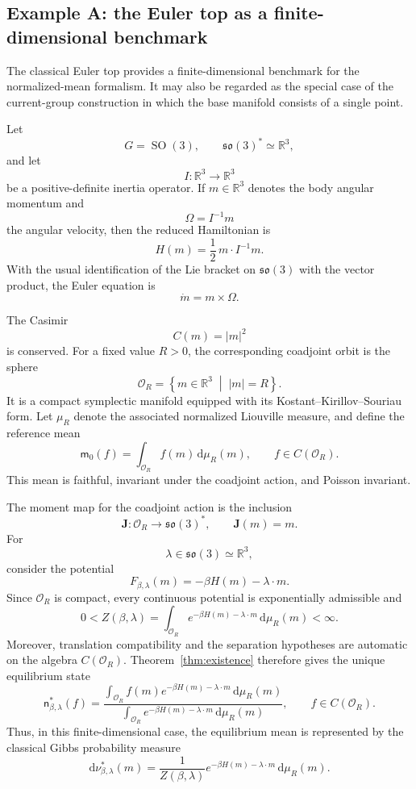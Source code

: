 \documentclass[11pt,reqno]{amsart}
\begin{document}
\subsection{Example A: the Euler top as a finite-dimensional benchmark}
\label{subsec:euler-top-example}

The classical Euler top provides a finite-dimensional benchmark for the
normalized-mean formalism. It may also be regarded as the special case
of the current-group construction in which the base manifold consists
of a single point.

Let
\[
G=\operatorname{SO}(3),
\qquad
\mathfrak{so}(3)^*\simeq\mathbb R^3,
\]
and let
\[
I\colon\mathbb R^3\longrightarrow\mathbb R^3
\]
be a positive-definite inertia operator. If
$m\in\mathbb R^3$ denotes the body angular momentum and
\[
\Omega=I^{-1}m
\]
the angular velocity, then the reduced Hamiltonian is
\[
H(m)
=
\frac12\,m\cdot I^{-1}m.
\]
With the usual identification of the Lie bracket on
$\mathfrak{so}(3)$ with the vector product, the Euler equation is
\[
\dot m=m\times\Omega.
\]

The Casimir
\[
C(m)=|m|^2
\]
is conserved. For a fixed value $R>0$, the corresponding coadjoint
orbit is the sphere
\[
\mathcal O_R
=
\left\{
m\in\mathbb R^3
\;\middle|\;
|m|=R
\right\}.
\]
It is a compact symplectic manifold equipped with its
Kostant--Kirillov--Souriau form. Let $\mu_R$ denote the associated
normalized Liouville measure, and define the reference mean
\[
\mathsf m_0(f)
=
\int_{\mathcal O_R}f(m)\,\mathrm d\mu_R(m),
\qquad
f\in C(\mathcal O_R).
\]
This mean is faithful, invariant under the coadjoint action, and
Poisson invariant.

The moment map for the coadjoint action is the inclusion
\[
\mathbf J\colon\mathcal O_R\longrightarrow\mathfrak{so}(3)^*,
\qquad
\mathbf J(m)=m.
\]
For
\[
\lambda\in\mathfrak{so}(3)\simeq\mathbb R^3,
\]
consider the potential
\[
F_{\beta,\lambda}(m)
=
-\beta H(m)-\lambda\cdot m.
\]
Since $\mathcal O_R$ is compact, every continuous potential is
exponentially admissible and
\[
0<
Z(\beta,\lambda)
=
\int_{\mathcal O_R}
e^{-\beta H(m)-\lambda\cdot m}
\,\mathrm d\mu_R(m)
<\infty.
\]
Moreover, translation compatibility and the separation hypotheses are
automatic on the algebra $C(\mathcal O_R)$. Theorem~\ref{thm:existence}
therefore gives the unique equilibrium state
\[
\boxed{
\mathsf n_{\beta,\lambda}^*(f)
=
\frac{
\displaystyle
\int_{\mathcal O_R}
f(m)e^{-\beta H(m)-\lambda\cdot m}
\,\mathrm d\mu_R(m)
}{
\displaystyle
\int_{\mathcal O_R}
e^{-\beta H(m)-\lambda\cdot m}
\,\mathrm d\mu_R(m)
},
\qquad
f\in C(\mathcal O_R).
}
\]
Thus, in this finite-dimensional case, the equilibrium mean is
represented by the classical Gibbs probability measure
\[
\mathrm d\nu_{\beta,\lambda}^*(m)
=
\frac{1}{Z(\beta,\lambda)}
e^{-\beta H(m)-\lambda\cdot m}
\,\mathrm d\mu_R(m).
\]
\end{document}
